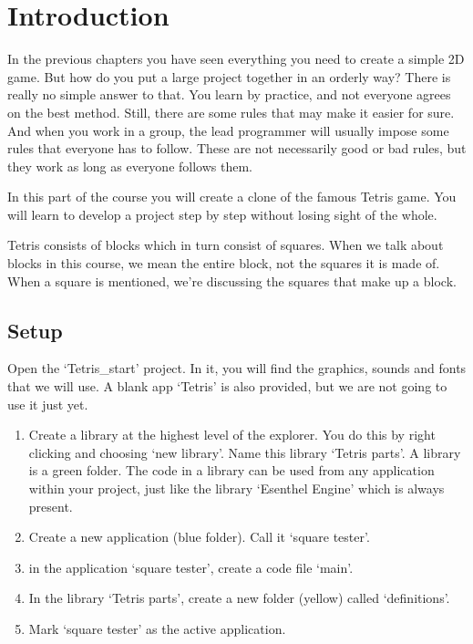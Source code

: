\chapter{Introduction}
In the previous chapters you have seen everything you need to create a simple 2D game. But how do you put a large project together in an orderly way? There is really no simple answer to that. You learn by practice, and not everyone agrees on the best method. Still, there are some rules that may make it easier for sure. And when you work in a group, the lead programmer will usually impose some rules that everyone has to follow. These are not necessarily good or bad rules, but they work as long as everyone follows them.

In this part of the course you will create a clone of the famous Tetris game. You will learn to develop a project step by step  without losing sight of the whole.

\begin{note}
Tetris consists of blocks which in turn consist of squares. When we talk about blocks in this course, we mean the entire block, not the squares it is made of. When a square is mentioned, we're discussing the squares that make up a block.
\end{note}

\section{Setup}
Open the `Tetris\_start' project. In it, you will find the graphics, sounds and fonts that we will use. A blank app `Tetris' is also provided, but we are not going to use it just yet.

\begin{enumerate}
	\item Create a library at the highest level of the explorer. You do this by right clicking and choosing `new library'. Name this library `Tetris parts'. A library is a green folder. The code in a library can be used from any application within your project, just like the library `Esenthel Engine' which is always present.
	\item Create a new application (blue folder). Call it `square tester'.
	\item in the application `square tester', create a code file `main'. 
	\item In the library `Tetris parts', create a new folder (yellow) called `definitions'.
	\item Mark `square tester' as the active application.
\end{enumerate}
	
